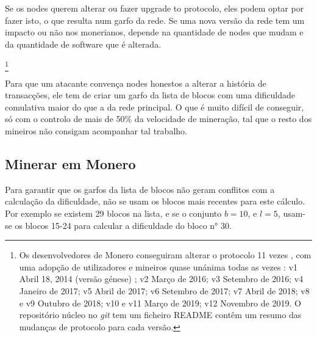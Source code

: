 Se os nodes querem alterar ou fazer upgrade to protocolo, eles podem optar por fazer isto, o que resulta num garfo da rede. Se uma nova versão da rede tem um impacto ou não nos monerianos, depende na quantidade de nodes que mudam e da quantidade de software que é alterada.


\footnote{
Os desenvolvedores de Monero conseguiram alterar o protocolo 11 vezes , com uma adopção de utilizadores e mineiros quase unánima todas as vezes : v1 Abril 18, 2014 (versão génese) \cite{bitmonero-launched}; v2 Março de 2016; v3 Setembro de 2016; v4 Janeiro de 2017; v5 Abril de 2017; v6 Setembro de 2017; v7 Abril de 2018; v8 e v9 Outubro de 2018; v10 e v11 Março de 2019; v12 Novembro de 2019. O repositório núcleo no {\em git} tem um ficheiro README contêm um resumo das mudanças de protocolo para cada versão.}

Para que um atacante convença nodes honestos a alterar a história de transacções, ele tem de criar um garfo da lista de blocos com uma dificuldade comulativa maior do que a da rede principal. O que é muito difícil de conseguir, só com o controlo de mais de 50\% da velocidade de mineração, tal que o resto dos mineiros não consigam acompanhar tal trabalho. \cite{Nakamoto_bitcoin}



\subsection{Minerar em Monero} %

Para garantir que os garfos da lista de blocos não geram conflitos com a calculação da dificuldade, não se usam os blocos mais recentes para este cálculo. Por exemplo se existem 29 blocos na lista, e se o conjunto $b = 10$, e $l = 5$, usam-se os blocos 15-24 para calcular a dificuldade do bloco n° 30.  

